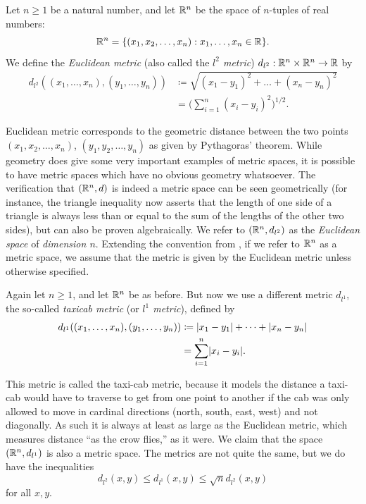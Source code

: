 \begin{eg}\label{ii:1.1.6}
  Let \(n \geq 1\) be a natural number, and let \(\mathbb{R}^n\) be the space of \(n\)-tuples of real numbers:
  \[
    \R^n = \set{(x_1, x_2, \dots, x_n) : x_1, \dots, x_n \in \R}.
  \]
  We define the \emph{Euclidean metric} (also called the \emph{\(l^2\) metric}) \(d_{l^2} : \mathbb{R}^n \times\mathbb{R}^n \to \mathbb{R}\) by
  \begin{align*}
    d_{l^2}((x_1, \dots, x_n), (y_1, \dots, y_n)) & \coloneqq \sqrt{(x_1 - y_1)^2 + \dots + (x_n - y_n)^2} \\
                                                  & = \bigg(\sum_{i = 1}^n (x_i - y_i)^2\bigg)^{1 / 2}.
  \end{align*}
\end{eg}

\begin{note}
  Euclidean metric corresponds to the geometric distance between the two points \((x_1, x_2, \dots, x_n)\), \((y_1, y_2, \dots, y_n)\) as given by Pythagoras' theorem.
  While geometry does give some very important examples of metric spaces, it is possible to have metric spaces which have no obvious geometry whatsoever.
  The verification that \((\mathbb{R}^n, d)\) is indeed a metric space can be seen geometrically (for instance, the triangle inequality now asserts that the length of one side of a triangle is always less than or equal to the sum of the lengths of the other two sides), but can also be proven algebraically.
  We refer to \((\mathbb{R}^n , d_{l^2})\) as the \emph{Euclidean space} of \emph{dimension \(n\)}.
  Extending the convention from , if we refer to \(\mathbb{R}^n\) as a metric space, we assume that the metric is given by the Euclidean metric unless otherwise specified.
\end{note}

\begin{eg}\label{ii:1.1.7}
  Again let \(n \geq 1\), and let \(\mathbb{R}^n\) be as before.
  But now we use a different metric \(d_{l^1}\), the so-called \emph{taxicab metric} (or \emph{\(l^1\) metric}), defined by
  \begin{align*}
    d_{l^1}((x_1, \dots, x_n), (y_1, \dots, y_n)) & \coloneqq \abs{x_1 - y_1} + \dots + \abs{x_n - y_n} \\
                                                  & = \sum_{i = 1}^n \abs{x_i - y_i}.
  \end{align*}
\end{eg}

\begin{note}
  This metric is called the taxi-cab metric, because it models the distance a taxi-cab would have to traverse to get from one point to another if the cab was only allowed to move in cardinal directions (north, south, east, west) and not diagonally.
  As such it is always at least as large as the Euclidean metric, which measures distance ``as the crow flies,'' as it were.
  We claim that the space \((\mathbb{R}^n, d_{l^1})\) is also a metric space.
  The metrics are not quite the same, but we do have the inequalities
  \[
    d_{l^2}(x, y) \leq d_{l^1}(x, y) \leq \sqrt{n} d_{l^2}(x, y)
  \]
  for all \(x, y\).
\end{note}

